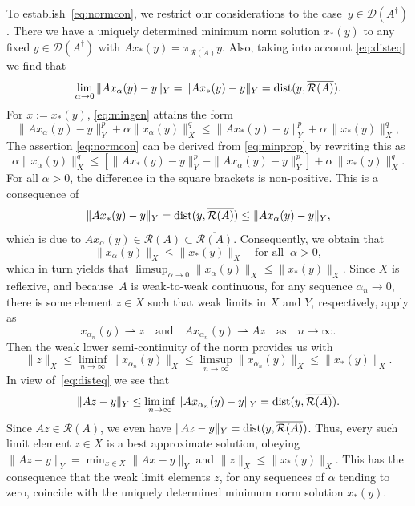 \documentclass[12pt]{amsart}
\newcommand{\domain}{\mathcal D}
\newcommand{\range}{\mathcal R}
\newcommand{\Ad}{A^\dag}
\newcommand{\pr}{\pi_{\overline{\range(A)}}}
\theoremstyle{remark}
\begin{document}
To establish~\eqref{eq:normcon}, we restrict our considerations to the case~$y \in \domain(\Ad)$. There we have a uniquely determined minimum norm solution $x_*(y)$ to any fixed $y \in \domain(\Ad)$ with $Ax_*(y)=\pr y$. Also, taking into account \eqref{eq:disteq} we find that 
$$\lim_{\alpha \to 0} \|Ax_\alpha(y)-y\|_Y =\|Ax_*(y)-y\|_Y={\rm dist}(y,\overline{\range(A)}).$$ 
For $x:=x_*(y)$, \eqref{eq:mingen} attains the form
\begin{equation} \label{eq:minprop}
\|Ax_\alpha(y)-y\|_Y^p + \alpha\|x_\alpha(y)\|^q_X  \le  \|Ax_*(y)-y\|_Y^p +\alpha\,\|x_*(y)\|_X^q,
\end{equation}
The assertion \eqref{eq:normcon} 
can be derived from \eqref{eq:minprop} by rewriting this as
$$ \alpha\|x_\alpha(y)\|^q_X  \le \left[ \|Ax_*(y)-y\|_Y^p - \|Ax_\alpha(y)-y\|_Y^p \right]  +\alpha\,\|x_*(y)\|_X^q. $$
For all $\alpha>0$, the difference in the square brackets is non-positive. This is
a consequence of  $$\|Ax_*(y)-y\|_Y={\rm dist}(y,\overline{\range(A)}) \le  \|Ax_\alpha(y)-y\|_Y,$$ 
which is due to $Ax_\alpha(y) \in \range(A) \subset \overline{\range(A)}$.
Consequently, we obtain that
\begin{equation} \label{eq:xnorm}
\|x_\alpha(y)\|_X \le \|x_*(y)\|_X \quad \mbox{for all} \;\; \alpha>0,
\end{equation}
which in turn yields that
$\limsup_{\alpha \to 0}\|x_\alpha(y)\|_X \le  \|x_*(y)\|_X $. Since $X$ is reflexive, and because~$A$ is weak-to-weak continuous, for any sequence $\alpha_n \to 0$, there is some element $z \in X$ such that weak limits in $X$ and $Y$, respectively, apply as 
$$x_{\alpha_n}(y) \rightharpoonup z \quad \mbox{and} \quad A x_{\alpha_n}(y) \rightharpoonup Az \quad \mbox{as} 
\quad n \to \infty. $$ Then the weak lower semi-continuity of the norm provides us with
$$
\|z\|_X \le \liminf_{n \to \infty} \|x_{\alpha_n}(y)\|_X \le  \limsup_{n \to \infty}  \|x_{\alpha_n}(y)\|_X   \le \|x_*(y)\|_X.
$$
In view of~\eqref{eq:disteq} we see that
$$
\|Az-y\|_Y \le \liminf_{n \to \infty} \|Ax_{\alpha_n}(y)-y\|_Y = {\rm dist}(y,\overline{\range(A)}).   
$$
Since $Az \in \range(A)$, we even have $\|Az-y\|_Y={\rm dist}(y,\overline{\range(A)})$. Thus, every such limit element
$z \in X$ is a best approximate solution, obeying $\|Az-y\|_Y=\min_{x \in X} \|Ax-y\|_Y$ and  
$\|z\|_X \le \|x_*(y)\|_X$. This has the consequence that the weak limit elements $z$, for any sequences of $\alpha$ tending to zero, coincide with the uniquely determined minimum norm solution $x_*(y)$. 
\end{document}
